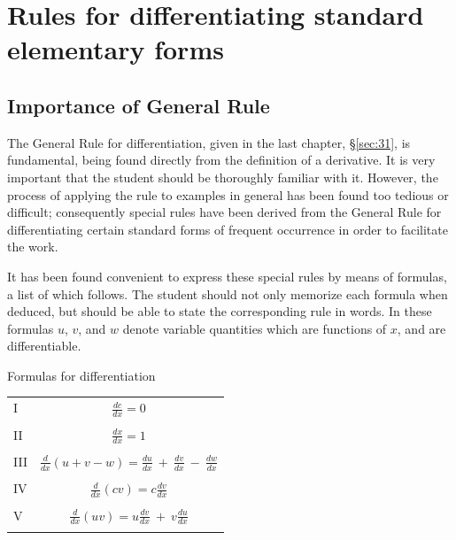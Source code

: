 
\chapter{Rules for differentiating standard elementary forms}

 
\section{Importance of General Rule}
\label{sec:33}

The General Rule for differentiation, given in the 
last chapter, %
\S \ref{sec:31},
is fundamental, being found directly from the definition 
of a derivative. %
It is very important that the 
student should be thoroughly familiar with it. However, the 
process of applying the rule to examples in general has been 
found too tedious or difficult; consequently special rules 
have been derived from the General Rule for differentiating 
certain standard forms of frequent occurrence in order to facilitate 
the work.

It has been found convenient to express these special rules by 
means of formulas, a list of which follows. The student 
should not only memorize each formula when deduced, but 
should be able to state the corresponding rule in words. In 
these formulas $u$, $v$, and $w$ denote variable quantities 
which are functions of $x$, and are differentiable.

\begin{center}
Formulas for differentiation
\end{center}

\begin{tabular}{lc}
I 	&  	$\frac{dc}{dx} 	= 0$\\
 & \\
II &	  	$\frac{dx}{dx} 	= 1$\\
 & \\
III &	  	$\frac{d}{dx}(u + v - w) 	= \frac{du}{dx}\ +\ \frac{dv}{dx}\ -\ \frac{dw}{dx}$\\
 & \\
IV 	 & 	$\frac{d}{dx} (cv) 	= c \frac{dv}{dx}$\\
 & \\
V 	 & 	$\frac{d}{dx} (uv) 	= u\frac{dv}{dx}\ +\ v\frac{du}{dx}$\\
 & \\
\end{tabular}

